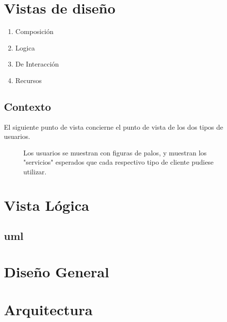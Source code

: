 \documentclass{article}
\begin{document}
  \section{Vistas de dise\~no}

  \begin{enumerate}
      \item Composici\'on 
      \item Logica
      \item De Interacci\'on
      \item Recursos
  \end{enumerate}


\subsection{Contexto}
  El siguiente punto de vista concierne el punto de vista de los dos tipos de usuarios.

  \begin{figure}[!htb]
    \begin{center}
      
    \end{center}
    \caption{Los usuarios se muestran con figuras de palos, y muestran los "servicios" esperados que cada respectivo tipo de cliente pudiese utilizar.}\label{fig:}
  \end{figure}
  

\section{Vista L\'ogica}
\subsection{uml}

\begin{figure}[!htb]
  \begin{center}
    
  \end{center}
  \caption{}\label{fig:}
\end{figure}


\section{Dise\~no General}
  
\section{Arquitectura}
\end{document}
